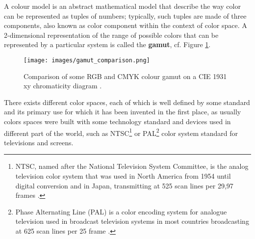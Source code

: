 \documentclass[12pt,a4paper]{extarticle}
\newcommand{\linespace}{\vspace{0pt}}
\begin{document}
A colour model is an abstract mathematical model that describe the way color can be represented as tuples of numbers; typically, such tuples are made of three components, also known as color component within the context of color space.
A 2-dimensional representation of the range of possible colors that can be represented by a particular system is called the \textbf{gamut}, cf. Figure \ref{fig:gamut}.

\begin{figure}[hbtp]
\centering
\texttt{[image: images/gamut\_comparison.png]}
\caption{Comparison of some RGB and CMYK colour gamut on a CIE 1931 xy chromaticity diagram \cite{wiki_gamut:1}.}
\label{fig:gamut}
\end{figure}


There exists different color spaces, each of which is well defined by some standard and its primary use for which it has been invented in the first place, as usually colors spaces were built with some technology standard and devices used in different part of the world, such as NTSC\footnote{NTSC, named after the National Television System Committee, is the analog television color system that was used in North America from 1954 until digital conversion and in Japan, transmitting at 525 scan lines per 29,97 frames \cite{wiki_ntsc:1}.} or PAL\footnote{Phase Alternating Line (PAL) is a color encoding system for analogue television used in broadcast television systems in most countries broadcasting at 625 scan lines per 25 frame \cite{wiki_pal:1}.} color system standard for televisions and screens.
\linespace
\end{document}
